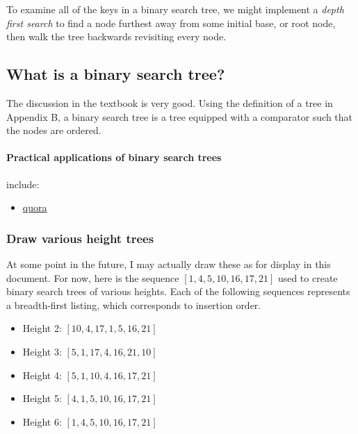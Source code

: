 \documentclass{article}
\begin{document}
To examine all of the keys in a binary search tree, we might
implement a \emph{depth first search} to find a node furthest
away from some initial base, or root node, then walk the tree
backwards revisiting every node.



\subsection{What is a binary search tree?}

The discussion in the textbook is very good. Using the definition of
a tree in Appendix B, a binary search tree is a tree equipped with
a comparator such that the nodes are ordered.

\paragraph{Practical applications of binary search trees} include:

\begin{itemize}
  \item \href{https://www.quora.com/What-are-some-practical-applications-of-binary-trees/answer/Az-Na?__nsrc__=4&__snid3__=1020331524}{quora}
\end{itemize}

\subsubsection{Draw various height trees}

At some point in the future, I may actually draw these as for
display in this document. For now, here is the sequence
$[1, 4, 5, 10, 16, 17, 21]$ used to create binary search trees
of various heights. Each of the following sequences represents
a breadth-first listing, which corresponds to insertion order.

\begin{itemize}
  \item Height 2: $[10, 4, 17, 1, 5, 16, 21]$
  \item Height 3: $[5, 1, 17, 4, 16, 21, 10]$
  \item Height 4: $[5, 1, 10, 4, 16, 17, 21]$
  \item Height 5: $[4, 1, 5, 10, 16, 17, 21]$
  \item Height 6: $[1, 4, 5, 10, 16, 17, 21]$
\end{itemize}
\end{document}
